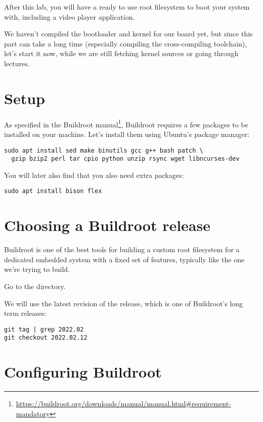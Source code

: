 
After this lab, you will have a ready to use root filesystem to boot
your system with, including a video player application.

We haven't compiled the bootloader and kernel for our board yet,
but since this part can take a long time (especially compiling the
cross-compiling toolchain), let's start it now, while we are still
fetching kernel sources or going through lectures.

\section{Setup}

As specified in the Buildroot
manual\footnote{\url{https://buildroot.org/downloads/manual/manual.html\#requirement-mandatory}},
Buildroot requires a few packages to be installed on your
machine. Let's install them using Ubuntu's package manager:

\begin{verbatim}
sudo apt install sed make binutils gcc g++ bash patch \
  gzip bzip2 perl tar cpio python unzip rsync wget libncurses-dev
\end{verbatim}

You will later also find that you also need extra packages:

\begin{verbatim}
sudo apt install bison flex
\end{verbatim}

\section{Choosing a Buildroot release}

Buildroot is one of the best tools for building a custom root filesystem
for a dedicated embedded system with a fixed set of features, typically
like the one we're trying to build.

Go to the  directory.

We will use the latest revision of the  release, which is
one of Buildroot's long term releases:

\begin{verbatim}
git tag | grep 2022.02
git checkout 2022.02.12
\end{verbatim}

\section{Configuring Buildroot}

